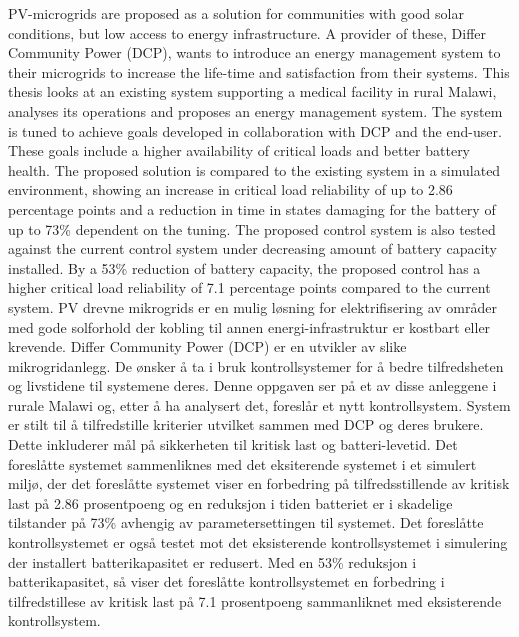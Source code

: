 PV-microgrids are proposed as a solution for communities with good solar conditions, but low access to energy infrastructure. A provider of these, Differ Community Power (DCP), wants to introduce an energy management system to their microgrids to increase the life-time and satisfaction from their systems. This thesis looks at an existing system supporting a medical facility in rural Malawi, analyses its operations and proposes an energy management system. The system is tuned to achieve goals developed in collaboration with DCP and the end-user. These goals include a higher availability of critical loads and better battery health. The proposed solution is compared to the existing system in a simulated environment, showing an increase in critical load reliability of up to 2.86 percentage points and a reduction in time in states damaging for the battery of up to 73\% dependent on the tuning. The proposed control system is also tested against the current control system under decreasing amount of battery capacity installed. By a 53\% reduction of battery capacity, the proposed control has a higher critical load reliability of 7.1 percentage points compared to the current system.
\newline
\newline
\newline
PV drevne mikrogrids er en mulig løsning for elektrifisering av områder med gode solforhold der kobling til annen energi-infrastruktur er kostbart eller krevende. Differ Community Power (DCP) er en utvikler av slike mikrogridanlegg. De ønsker å ta i bruk kontrollsystemer for å bedre tilfredsheten og livstidene til systemene deres. Denne oppgaven ser på et av disse anleggene i rurale Malawi og, etter å ha analysert det, foreslår et nytt kontrollsystem. System er stilt til å tilfredstille kriterier utvilket sammen med DCP og deres brukere. Dette inkluderer mål på sikkerheten til kritisk last og batteri-levetid. Det foreslåtte systemet sammenliknes med det eksiterende systemet i et simulert miljø, der det foreslåtte systemet viser en forbedring på tilfredsstillende av kritisk last på 2.86 prosentpoeng og en reduksjon i tiden batteriet er i skadelige tilstander på 73\% avhengig av parametersettingen til systemet. Det foreslåtte kontrollsystemet er også testet mot det eksisterende kontrollsystemet i simulering der installert batterikapasitet er redusert. Med en 53\% reduksjon i batterikapasitet, så viser det foreslåtte kontrollsystemet en forbedring i tilfredstillese av kritisk last på 7.1 prosentpoeng sammanliknet med eksisterende kontrollsystem. 




